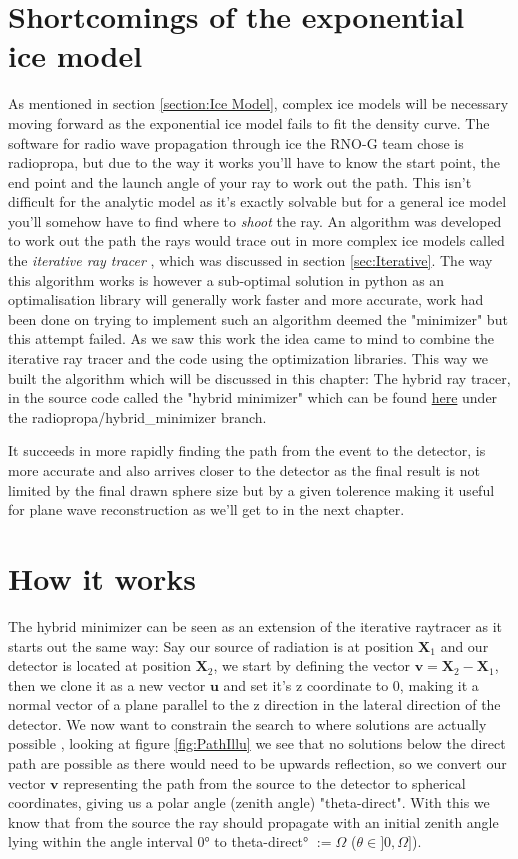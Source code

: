 \documentclass[11pt,a4paper,faculty=we,language=en,doctype=report]{cls/ugent-doc}
\begin{document}
\section{Shortcomings of the exponential ice model}
As mentioned in section \ref{section:Ice Model}, complex ice models will be
necessary moving forward as the exponential ice model fails to fit the density
curve.  The software for radio wave propagation through ice the RNO-G team
chose is radiopropa\cite{Winchen_2019}, but due to the way it works you'll have
to know the start point, the end point and the launch angle of your ray to work
out the path. This isn't difficult for the analytic model as it's exactly
solvable but for a general ice model you'll somehow have to find where to
\textit{shoot} the ray. An algorithm was developed to work out the path the
rays would trace out in more complex ice models called the \textit{iterative
ray tracer} \cite{2022icrc.confE1027O}, which was discussed in section
\ref{sec:Iterative}. The way this algorithm works is however a sub-optimal
solution in python as an optimalisation library will generally work faster and
more accurate, work had been done on trying to implement such an algorithm
deemed the "minimizer" but this attempt failed.  As we saw this work the idea
came to mind to combine the iterative ray tracer and the code using the
optimization libraries. This way we built the algorithm which will be discussed in
this chapter: The hybrid ray tracer, in the source code called the "hybrid
minimizer" which can be found
\href{https://github.com/arthuradriaens-code/NuRadioMC.git}{here} under the
radiopropa/hybrid\_minimizer branch.

It succeeds in more rapidly finding the path from the event to the detector, is
more accurate and also arrives closer to the detector as the final result is
not limited by the final drawn sphere size but by a given tolerence making it
useful for plane wave reconstruction as we'll get to in the next chapter.

\section{How it works}
The hybrid minimizer can be seen as an extension of the iterative raytracer as
it starts out the same way: Say our source of radiation is at position
$\mathbf{X}_1$ and our detector is located at position $\mathbf{X}_2$, we start
by defining the vector $\mathbf{v} = \mathbf{X}_2 - \mathbf{X}_1$, then we
clone it as a new vector $\mathbf{u}$ and set it's z coordinate to 0, making it a normal
vector of a plane parallel to the z direction in the lateral direction of the detector. 
We now want to constrain the search to where solutions are actually possible
, looking at figure \ref{fig:PathIllu}
we see that no solutions below the direct path are possible as there would need
to be upwards reflection, so we convert our vector $\mathbf{v}$ representing
the path from the source to the detector to spherical coordinates, giving us a
polar angle (zenith angle) "theta-direct". With this we know that from the source
the ray should propagate with an initial zenith angle lying within the angle interval
0° to theta-direct° $:= \Omega$ ($\theta \in ]0,\Omega]$).
\end{document}
